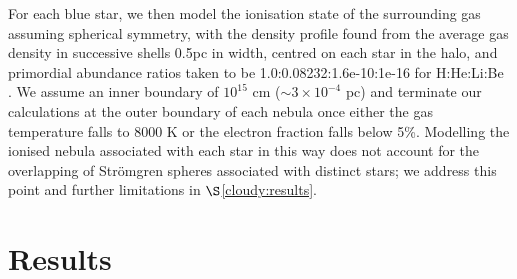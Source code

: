 \documentclass[twocolumn,iop,revtex4]{openjournal}
\begin{document}
For each blue star, we then model the ionisation state of the surrounding gas assuming spherical
symmetry, with the density profile found from the average gas density in successive shells 0.5pc
in width, centred on each star in the halo, and primordial abundance ratios taken to be
1.0:0.08232:1.6e-10:1e-16 for H:He:Li:Be \citep[consistent with the results of the][table 2, see
  {\sc cloudy} documentation for further discussion]{Planck_2014}. We assume an inner boundary
of $10^{15}$ cm ($\sim 3 \times 10^{-4}$ pc) and terminate our calculations at the outer boundary of
each nebula once either the gas temperature falls to 8000 K or the electron fraction falls below 5\%.
Modelling the ionised nebula associated with each star in this way does not account for the
overlapping of Str{\"o}mgren spheres associated with distinct stars; we address this point and
further limitations in $\S$\ref{cloudy:results}.


\section{Results} \label{Sec:Results}
\end{document}
